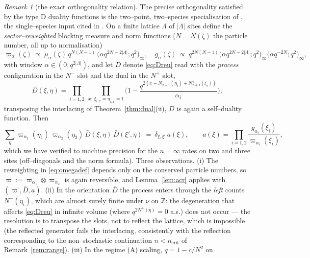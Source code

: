 \documentclass[11pt]{article}
\theoremstyle{plain}
\theoremstyle{definition}
\theoremstyle{remark}
\newtheorem{remark}[theorem]{Remark}
\newcommand{\Z}{\mathbb{Z}}\newcommand{\R}{\mathbb{R}}\newcommand{\N}{\mathbb{N}}
\begin{document}
\begin{remark}[the exact orthogonality relation]\label{rem:orthstatus}
The precise orthogonality satisfied by the type D duality functions is the
two--point, two--species specialisation of \cite[Thm.~3.2]{CFG20}, the
single--species input cited in \cite[\S3.1]{REU}. On a finite lattice $\Lambda$ of
$|\Lambda|$ sites define the \emph{sector--reweighted} blocking measure and norm
functions ($N=N(\zeta)$ the particle number, all up to normalisation)
\begin{equation}\label{eq:omegadef}
  \varpi_\alpha(\zeta)\ \propto\ \mu_\alpha(\zeta)\,q^{N(N-1)}\,
  \big(\alpha q^{2N-2|\Lambda|};q^2\big)_\infty,\quad
  g_\alpha(\zeta)\ \propto\ q^{2N(N-1)}
  \big(\alpha q^{2N-2|\Lambda|};q^2\big)_\infty\big(\alpha q^{-2N};q^2\big)_\infty,
\end{equation}
with window $\alpha\in(0,q^{2|\Lambda|})$, and let $\bar D$ denote \eqref{eq:Dreu}
read with the \emph{process} configuration in the $N^-$ slot and the dual in the
$N^+$ slot,
\[
  \bar D(\xi,\eta)=\prod_{i=1,2}\ \prod_{x:\,\xi_{i,x}=\eta_{i,x}=1}
  \Big(1-\frac{q^{2\left(x-N^-_{x-1}(\eta_i)+N^+_{x+1}(\xi_i)\right)}}{\alpha_i}\Big);
\]
transposing the interlacing of Theorem~\ref{thm:dual}(ii), $\bar D$ is again a
self--duality function. Then
\begin{equation}\label{eq:orthexact}
  \sum_\eta \varpi_{\alpha_1}(\eta_1)\,\varpi_{\alpha_2}(\eta_2)\,
  \bar D(\xi,\eta)\,\bar D(\xi',\eta)\ =\ \delta_{\xi,\xi'}\,a(\xi),\qquad
  a(\xi)=\prod_{i=1,2}\frac{g_{\alpha_i}(\xi_i)}{\varpi_{\alpha_i}(\xi_i)},
\end{equation}
which we have verified to machine precision for the $n=\infty$ rates on two and
three sites (off--diagonals and the norm formula). Three observations. (i) The
reweighting in \eqref{eq:omegadef} depends only on the conserved particle numbers,
so $\varpi:=\varpi_{\alpha_1}\otimes\varpi_{\alpha_2}$ is again reversible, and
Lemma~\ref{lem:acr} applies with $(\varpi,\bar D,a)$. (ii) In the orientation
$\bar D$ the process enters through the \emph{left} counts $N^-(\eta_i)$, which are
almost surely finite under $\nu$ on $\Z$: the degeneration that affects
\eqref{eq:Dreu} in infinite volume (where $q^{2N^+(\eta)}=0$ a.s.) does not occur ---
the resolution is to transpose the slots, not to reflect the lattice, which is
impossible (the reflected generator fails the interlacing, consistently with the
reflection corresponding to the non--stochastic continuation $n<n_{\mathrm{crit}}$
of Remark~\ref{rem:range}). (iii) In the regime (A) scaling, $q=1-c/N^2$ on

\end{remark}
\end{document}

